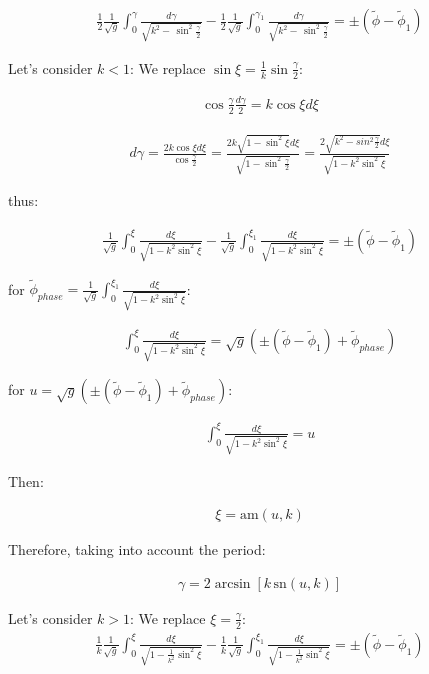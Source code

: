 \documentclass[11pt,a4paper,oneside]{article}
\begin{document}
\begin{align}
\frac{1}{2}\frac{1}{\sqrt{g}}\int_{0}^\gamma\frac{d \gamma}{\sqrt{k^2-\,\sin^2\frac{\gamma}{2}}}-\frac{1}{2}\frac{1}{\sqrt{g}}\int_0^{\gamma_1}\frac{d \gamma}{\sqrt{k^2-\,\sin^2\frac{\gamma}{2}}}=\pm(\tilde{\phi}-\tilde{\phi}_1)
\end{align}

Let's consider $k<1$: 
We replace $\sin \xi= \frac{1}{k}\sin\frac{\gamma}{2}$:

\begin{align}
\cos\frac{\gamma}{2}\frac{d\gamma}{2}=k\cos\xi d\xi
\end{align}

\begin{align}
d\gamma=\frac{2k\cos\xi d\xi}{\cos\frac{\gamma}{2}}=\frac{2k\sqrt{1-\sin^2\xi} d\xi}{\sqrt{1-\sin^2\frac{\gamma}{2}}}=\frac{2\sqrt{k^2-sin^2\frac{\gamma}{2}} d\xi}{\sqrt{1-k^2\sin^2\xi}}
\end{align}

thus:

\begin{align}
\frac{1}{\sqrt{g}}\int_{0}^\xi\frac{ d\xi}{\sqrt{1-k^2\sin^2\xi}}-\frac{1}{\sqrt{g}}\int_0^{\xi_1}\frac{ d\xi}{\sqrt{1-k^2\sin^2\xi}}=\pm(\tilde{\phi}-\tilde{\phi}_1)
\end{align}

for $\tilde{\phi}_{phase}=\frac{1}{\sqrt{g}}\int_0^{\xi_1}\frac{ d\xi}{\sqrt{1-k^2\sin^2\xi}}$:

\begin{align}
\int_{0}^\xi\frac{ d\xi}{\sqrt{1-k^2\sin^2\xi}}=\sqrt{g}(\pm(\tilde{\phi}-\tilde{\phi}_1)+\tilde{\phi}_{phase})
\end{align}

for $u=\sqrt{g}(\pm(\tilde{\phi}-\tilde{\phi}_1)+\tilde{\phi}_{phase})$:

\begin{align}
\int_{0}^\xi\frac{ d\xi}{\sqrt{1-k^2\sin^2\xi}}=u
\end{align}

Then: 

\begin{align}
\xi=\mathrm{am}(u,k)
\end{align}

Therefore, taking into account the period:

\begin{align}
\gamma=2\arcsin[k\,\mathrm{sn}(u,k)]
\end{align}

Let's consider $k > 1$: 
We replace $\xi= \frac{\gamma}{2}$:
\begin{align}
\frac{1}{k}\frac{1}{\sqrt{g}}\int_{0}^\xi\frac{d \xi}{\sqrt{1-\frac{1}{k^2}\sin^2\xi}}-\frac{1}{k}\frac{1}{\sqrt{g}}\int_{0}^{\xi_1}\frac{d \xi}{\sqrt{1-\frac{1}{k^2}\sin^2\xi}}=\pm(\tilde{\phi}-\tilde{\phi}_1)
\end{align}
\end{document}

